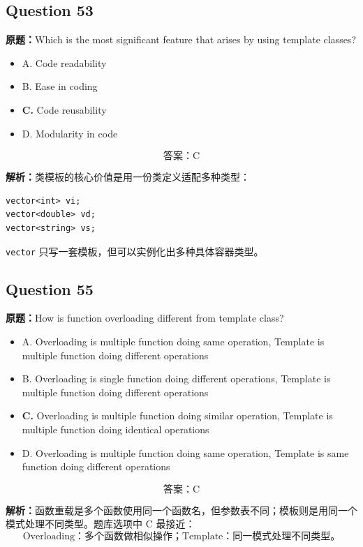 \documentclass[11pt, a4paper]{article}
\begin{document}

\subsection*{Question 53}
\textbf{原题：}Which is the most significant feature that arises by using template classes?
\begin{itemize}
    \item A. Code readability
    \item B. Ease in coding
    \item \textbf{C.} Code reusability
    \item D. Modularity in code
\end{itemize}

\[
\boxed{\text{答案：C}}
\]

\textbf{解析：}类模板的核心价值是用一份类定义适配多种类型：
\begin{lstlisting}
vector<int> vi;
vector<double> vd;
vector<string> vs;
\end{lstlisting}
\texttt{vector} 只写一套模板，但可以实例化出多种具体容器类型。


\subsection*{Question 55}
\textbf{原题：}How is function overloading different from template class?
\begin{itemize}
    \item A. Overloading is multiple function doing same operation, Template is multiple function doing different operations
    \item B. Overloading is single function doing different operations, Template is multiple function doing different operations
    \item \textbf{C.} Overloading is multiple function doing similar operation, Template is multiple function doing identical operations
    \item D. Overloading is multiple function doing same operation, Template is same function doing different operations
\end{itemize}

\[
\boxed{\text{答案：C}}
\]

\textbf{解析：}函数重载是多个函数使用同一个函数名，但参数表不同；模板则是用同一个模式处理不同类型。题库选项中 C 最接近：
\[
\text{Overloading：多个函数做相似操作；Template：同一模式处理不同类型。}
\]
\end{document}
